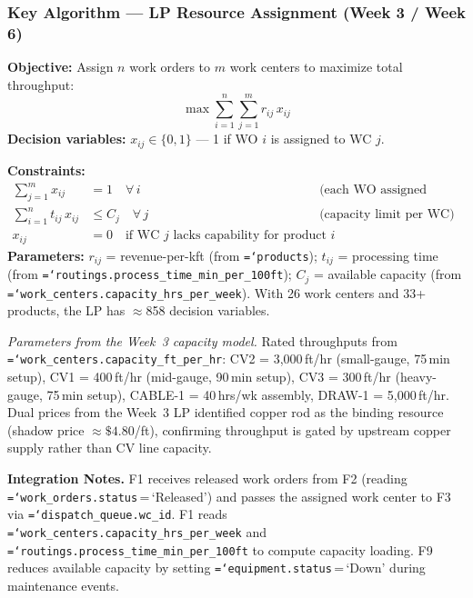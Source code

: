 \documentclass[11pt]{article}
\newcommand{\tfield}[1]{\texttt{\hyphenchar\font=`\-\relax #1}}
\begin{document}
\subsubsection*{Key Algorithm --- LP Resource Assignment (Week 3 / Week 6)}

\begin{eqbox}
\textbf{Objective:} Assign $n$ work orders to $m$ work centers to maximize total throughput:
\[
\max \sum_{i=1}^{n}\sum_{j=1}^{m} r_{ij}\, x_{ij}
\]
\textbf{Decision variables:} $x_{ij} \in \{0,1\}$ --- 1 if WO $i$ is assigned to WC $j$.

\textbf{Constraints:}
\begin{align}
\sum_{j=1}^{m} x_{ij} &= 1 \quad \forall\, i & &\text{(each WO assigned exactly once)} \\
\sum_{i=1}^{n} t_{ij}\, x_{ij} &\leq C_j \quad \forall\, j & &\text{(capacity limit per WC)} \\
x_{ij} &= 0 \quad \text{if WC } j \text{ lacks capability for product } i
\end{align}
\textbf{Parameters:} $r_{ij}$ = revenue-per-kft (from \tfield{products}); $t_{ij}$ = processing time (from \tfield{routings.process\_time\_min\_per\_100ft}); $C_j$ = available capacity (from \tfield{work\_centers.capacity\_hrs\_per\_week}).  With 26 work centers and 33+ products, the LP has $\approx$858 decision variables.
\end{eqbox}

\textit{Parameters from the Week~3 capacity model.}
Rated throughputs from \tfield{work\_centers.\allowbreak capacity\_ft\_per\_hr}:
CV2 = 3{,}000\,ft/hr (small-gauge, 75\,min setup),
CV1 = 400\,ft/hr (mid-gauge, 90\,min setup),
CV3 = 300\,ft/hr (heavy-gauge, 75\,min setup),
CABLE-1 = 40\,hrs/wk assembly,
DRAW-1 = 5{,}000\,ft/hr.
Dual prices from the Week~3 LP identified copper rod as the binding resource (shadow price ${\approx}\$4.80$/ft), confirming throughput is gated by upstream copper supply rather than CV line capacity.

\textbf{Integration Notes.}
F1 receives released work orders from F2 (reading \tfield{work\_orders.\allowbreak status}\,=\,`Released') and passes the assigned work center to F3 via \tfield{dispatch\_queue.\allowbreak wc\_id}.  F1 reads \tfield{work\_centers.\allowbreak capacity\_hrs\_per\_week} and \tfield{routings.\allowbreak process\_time\_min\_per\_100ft} to compute capacity loading.  F9 reduces available capacity by setting \tfield{equipment.status}\,=\,`Down' during maintenance events.
\end{document}
